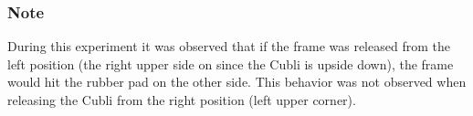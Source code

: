 \begin{minipage}{\linewidth}
\begin{minipage}{0.45\linewidth}
\begin{figure}[H]
			\centering
			\vspace{-.4cm}
			\captionsetup{justification=centering}
			\label{PendRad}
		\end{figure}%
	\end{minipage}
\end{minipage}

\subsubsection{Note}
During this experiment it was observed that if the frame was released from the left position (the right upper side on  since the Cubli is upside down), the frame would hit the rubber pad on the other side. This behavior was not observed when releasing the Cubli from the right position (left upper corner).

